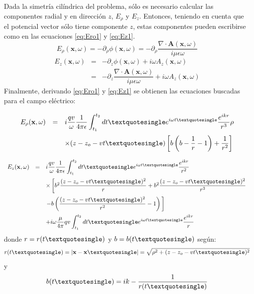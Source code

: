 Dada la simetr\'ia cil\'indrica del problema, s\'olo es necesario calcular las componentes radial y en direcci\'on $z$, $E_\rho$ y $E_z$.
Entonces, teniendo en cuenta que el potencial vector s\'olo tiene componente $z$, estas componentes pueden escribirse como en las ecuaciones \ref{eq:Ero1} y \ref{eq:Ez1}.
%
\begin{equation}
E_\rho(\mathbf{x},\omega)=
-\partial_\rho\phi(\mathbf{x},\omega)
=
-\partial_\rho\frac{\nabla\cdot\mathbf{A}(\mathbf{x},\omega)}{i\mu\epsilon\omega}
\label{eq:Ero1}
\end{equation}
%
\begin{equation}
	\renewcommand{\arraystretch}{2.5}
	\begin{array}{rcl}
	E_z(\mathbf{x},\omega)& = & 
	-\partial_z\phi(\mathbf{x},\omega) + i\omega A_z(\mathbf{x},\omega)\\
	& = &
	-\partial_z\dfrac{\nabla\cdot\mathbf{A}(\mathbf{x},\omega)}{i\mu\epsilon\omega}
	+ i\omega A_z(\mathbf{x},\omega)
	\end{array}
\label{eq:Ez1}
\end{equation}
%
Finalmente, derivando \ref{eq:Ero1} y \ref{eq:Ez1} se obtienen las ecuaciones buscadas para el campo el\'ectrico:
%
\begin{equation}
	\renewcommand{\arraystretch}{2.5}
	\begin{array}{rcl}
	E_\rho(\mathbf{x},\omega)& = & 
	i\dfrac{qv}{\omega}\dfrac{1}{4\pi\epsilon}
	\displaystyle\int_{t_1}^{t_2}dt\textquotesingle
	e^{i\omega t\textquotesingle}\dfrac{e^{ikr}}{r^3}\rho\\
	&&\times
	(z-z_o-vt\textquotesingle)
	\left[
		b\left(
			b-\dfrac{1}{r}-1
		\right)
		+\dfrac{1}{r^2}
	\right]\\
	\end{array}
\label{eq:Ero2}
\end{equation}
%
\begin{equation}
	\renewcommand{\arraystretch}{2.5}
	\begin{array}{rcl}
	E_z(\mathbf{x},\omega)& = & 
	i\dfrac{qv}{\omega}\dfrac{1}{4\pi\epsilon}
	\displaystyle\int_{t_1}^{t_2}dt\textquotesingle
	e^{i\omega t\textquotesingle}\dfrac{e^{ikr}}{r^2}\\
	&&\times
	\left[
		b^2\dfrac{(z-z_o-vt\textquotesingle)^2}{r}
		+
		b^2\dfrac{(z-z_o-vt\textquotesingle)^2}{r^3}
		\right.
		\\
		&&
		\left.
		-b\left(
			\dfrac{(z-z_o-vt\textquotesingle)^2}{r^2}-1
		\right)\,
	\right]\\
	&&+
	i\omega\dfrac{\mu}{4\pi}qv
	\displaystyle\int_{t_1}^{t_2}dt\textquotesingle
	e^{i\omega t\textquotesingle}\dfrac{e^{ikr}}{r}
	\end{array}
\label{eq:Ez2}
\end{equation}
%
donde $r=r(t\textquotesingle)$ y $b=b(t\textquotesingle)$ seg\'un:
%
\begin{equation}
r(t\textquotesingle)
= |\mathbf{x}-\mathbf{x}\textquotesingle|
= \sqrt{\rho^2+(z-z_o-vt\textquotesingle)^2}
\end{equation}
%
y
%
\begin{equation}
b(t\textquotesingle) = ik-\dfrac{1}{r(t\textquotesingle)}
\end{equation}

